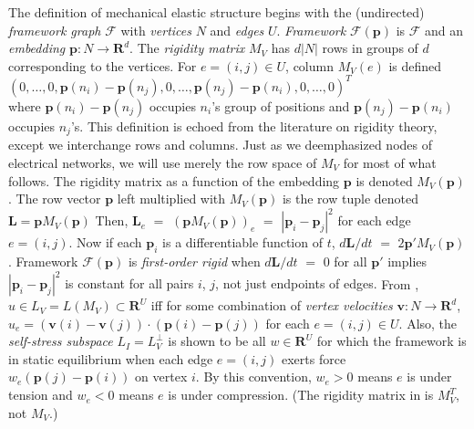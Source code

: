\documentclass{amsproc-sunycstr}
\def\Reals{\ensuremath{\mathbf R}}
\theoremstyle{plain}
\theoremstyle{definition}
\theoremstyle{remark}
\newcommand{\extra}[1]{{{#1}}}
\begin{document}
The definition of mechanical elastic structure begins with the 
(undirected) \textit{framework graph} $\mathcal{F}$ with \textit{vertices}
$N$ and \textit{edges} $U$.  \textit{Framework} $\mathcal{F}(\mathbf{p})$ 
is 
$\mathcal{F}$ and an \textit{embedding} 
$\mathbf{p}:N\rightarrow \Reals^d$.  
The \textit{rigidity matrix} $M_V$ 
has $d|N|$ rows in groups of $d$ corresponding to the vertices.
For $e=(i,j)\in U$, column $M_V(e)$ 
is defined \cite{RigidityBook}\\
$(0, \ldots,0, \mathbf{p}(n_i)-\mathbf{p}(n_j),0,\ldots,
\mathbf{p}(n_j)-\mathbf{p}(n_i), 0, \ldots,0)^T$\\
where $\mathbf{p}(n_i)-\mathbf{p}(n_j)$ occupies 
$n_i$'s group of positions
and $\mathbf{p}(n_j)-\mathbf{p}(n_i)$
occupies $n_j$'s.
\extra{This definition is echoed from the 
literature \cite{RigidityBook} on rigidity theory, except
we interchange rows and columns.  Just as we deemphasized nodes of electrical
networks, we will use merely the row space of $M_V$ for most of what follows.
}
\extra{The rigidity matrix as a 
function of the embedding $\mathbf{p}$ is denoted
$M_V(\mathbf{p})$.  The row vector $\mathbf{p}$ left multiplied with
$M_V(\mathbf{p})$
is the row tuple denoted $\mathbf{L}=\mathbf{p}M_V(\mathbf{p})$  Then, 
$\mathbf{L}_e$ $=$ 
$(\mathbf{p}M_V(\mathbf{p}))_e$ $=$ $|\mathbf{p}_i-\mathbf{p}_j|^2$ for
each edge $e=(i,j)$.  Now if each $\mathbf{p}_i$ is a differentiable function
of $t$, $d\mathbf{L}/dt$ $=$ $2\mathbf{p}'M_V(\mathbf{p})$.  Framework
$\mathcal{F}(\mathbf{p})$ is \textit{first-order rigid} when 
$d\mathbf{L}/dt$ $=$ $0$ for all $\mathbf{p}'$ implies 
$|\mathbf{p}_i-\mathbf{p}_j|^2$ is constant for all pairs $i$, $j$, not just
endpoints of edges. 
}%
From \cite{RigidityBook},
$u\in L_V=L(M_V)\subset\Reals^U$ 
iff 
for some combination of \textit{vertex velocities}
$\mathbf{v}:N\rightarrow\Reals^d$,
$u_e=(\mathbf{v}(i)-\mathbf{v}(j))\cdot(\mathbf{p}(i)-\mathbf{p}(j))$
for each $e=(i,j)\in U$.
Also,
the \textit{self-stress subspace} $L_I=L_V^\perp$%
is shown to be all $w\in\Reals^U$
for which the framework is in static
equilibrium when each edge $e=(i,j)$ exerts force 
$w_e(\mathbf{p}(j)-\mathbf{p}(i))$ on vertex $i$.  By this convention, 
$w_e>0$ means $e$ is under tension and $w_e<0$ means $e$ is under 
compression.  
(The rigidity matrix in \cite{RigidityBook} is $M_V^T$, not $M_V$.)
\end{document}
